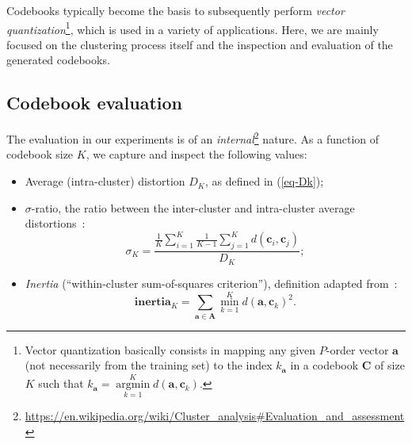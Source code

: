 \documentclass[letterpaper,12pt]{article}
\DeclareMathOperator*{\argmin}{argmin}
\newcommand{\bA}{\ensuremath{\mathbf{A}}}
\newcommand{\ba}{\ensuremath{\mathbf{a}}}
\newcommand{\bc}{\ensuremath{\mathbf{c}}}
\newcommand{\bC}{\ensuremath{\mathbf{C}}}
\begin{document}
    Codebooks typically become the basis to subsequently perform
    \textit{vector quantization}\footnote{
        Vector quantization basically consists in mapping any given $P$-order
        vector $\ba$ (not necessarily from the training set)
        to the index $k_\ba$ in a codebook $\bC$ of size $K$ such that
        $k_\ba = \argmin\limits_{k=1}^{K} d(\ba, \bc_k)$.
    },
    which is used in a variety of applications.
    Here, we are mainly focused on the clustering process itself and
    the inspection and evaluation of the generated codebooks.

    \subsection{Codebook evaluation}\label{subsec:codebook-evaluation}

    The evaluation in our experiments is of an \textit{internal}\footnote{
        \url{https://en.wikipedia.org/wiki/Cluster_analysis\#Evaluation_and_assessment}
    } nature.
    As a function of codebook size $K$, we capture and inspect the following values:

    \begin{itemize}
        \item Average (intra-cluster) distortion ${D_K}$, as defined in (\ref{eq-Dk});

        \item $\sigma$-ratio, the ratio between the inter-cluster and intra-cluster
            average distortions~\citep{Rabiner:Levinson:Sondhi:1983}:
            \[
                \sigma_K = \frac{ \frac{1}{K} \sum\limits_{i=1}^{K} \frac{1}{K-1} \sum\limits_{j=1}^{K} d(\bc_i, \bc_j) }
                           {D_K};
            \]

        \item \textit{Inertia} (``within-cluster sum-of-squares criterion''),
             definition adapted from~\citep{scikit-inertia}:
            \[
                \mathbf{inertia}_K = \sum_{\ba \in \bA} \min\limits_{k=1}^{K} d(\ba,\bc_k)^2. \label{eq-inertia}
            \]
    \end{itemize}
\end{document}
